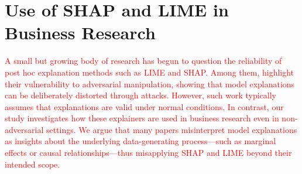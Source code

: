 \documentclass[mnsc,blindrev]{informs3}
\begin{document}
    
   
    
    
    \section{Use of SHAP and LIME in Business Research}
        \label{sec:use_in_b_research}





\textcolor{red}{A small but growing body of research has begun to question the reliability of post hoc explanation methods such as LIME and SHAP. Among them, \citep{slack19fooling} highlight their vulnerability to adversarial manipulation, showing that model explanations can be deliberately distorted through attacks. However, such work typically assumes that explanations are valid under normal conditions. In contrast, our study investigates how these explainers are used in business research even in non-adversarial settings. We argue that many papers misinterpret model explanations as insights about the underlying data-generating process—such as marginal effects or causal relationships—thus misapplying SHAP and LIME beyond their intended scope.}

\end{document}
